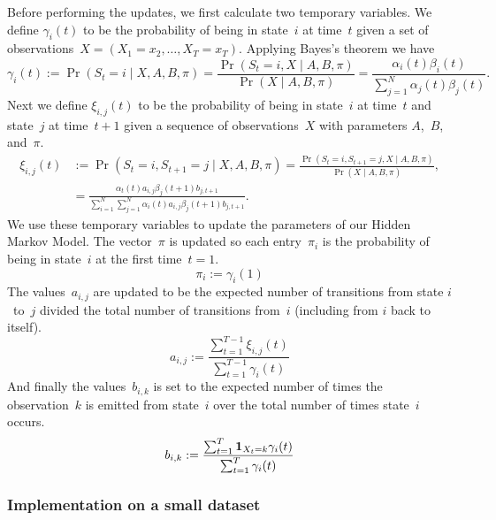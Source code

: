 \documentclass[twoside]{article}
\begin{document}
Before performing the updates, we first calculate two temporary variables.
We define $\gamma_i(t)$ to be the probability of being in state~$i$ at time~$t$ given a set of observations~${X = (X_1 = x_2, \ldots, X_T = x_T)}$.
Applying Bayes's theorem we have
\begin{equation*}
  \gamma_i(t) := \Pr(S_t = i \mid X, A, B, \pi) = \frac{\Pr(S_t = i, X \mid A, B, \pi)}{\Pr(X \mid A, B, \pi)} = \frac{\alpha_{i}(t) \beta_i(t)}{\sum_{j = 1}^N \alpha_j(t) \beta_j(t)}.
\end{equation*}
Next we define $\xi_{i, j}(t)$ to be the probability of being in state~$i$ at time~$t$ and state~$j$ at time~$t + 1$ given a sequence of observations~$X$ with parameters $A$,~$B$, and~$\pi$.
\begin{align*}
  \xi_{i, j}(t) &:= \Pr(S_t = i, S_{t+1} = j \mid X, A, B, \pi) = \frac{\Pr(S_t = i, S_{t+1} = j, X \mid A, B, \pi)}{\Pr(X \mid A, B, \pi)},\\
  &= \frac{\alpha_t(t) a_{i, j} \beta_j(t + 1) b_{j, t+1}}{\sum_{i=1}^N \sum_{j=1}^N \alpha_i(t) a_{i, j} \beta_j(t+1) b_{j, t+1}}.
\end{align*}
We use these temporary variables to update the parameters of our Hidden Markov Model.
The vector~$\pi$ is updated so each entry~$\pi_i$ is the probability of being in state~$i$ at the first time~${t = 1}$.
\begin{equation*}
  \pi_i := \gamma_i(1)
\end{equation*}
The values~$a_{i, j}$ are updated to be the expected number of transitions from state $i$~to~$j$ divided the total number of transitions from~$i$ (including from $i$ back to itself).
\begin{equation*}
  a_{i, j} := \frac{\sum_{t=1}^{T-1}\xi_{i, j}(t)}{\sum_{t=1}^{T-1}\gamma_i(t)}
\end{equation*}
And finally the values~$b_{i, k}$ is set to the expected number of times the observation~$k$ is emitted from state~$i$ over the total number of times state~$i$ occurs.
\begin{equation*}
  b_{i,k} := \frac{\sum_{t=1}^T \bm{\mathrm{1}}_{X_t = k}\gamma_i(t)}{\sum_{t=1}^T \gamma_i(t)}
\end{equation*}

\subsubsection{Implementation on a small dataset}\label{sec:impl-small-data}
\end{document}
